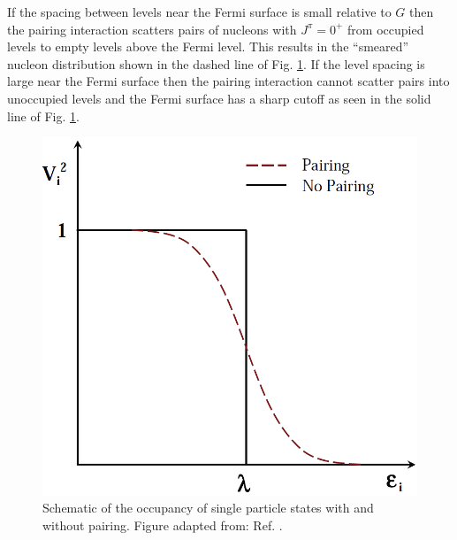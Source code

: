 If the spacing between levels near the Fermi surface is small relative to $G$ then the pairing interaction scatters pairs of nucleons with $J^{\pi}=0^+$ from occupied levels to empty levels above the Fermi level. This results in the ``smeared'' nucleon distribution shown in the dashed line of Fig. \ref{fig:chp2-pairing-fermi-surface}. If the level spacing is large near the Fermi surface then the pairing interaction cannot scatter pairs into unoccupied levels and the Fermi surface has a sharp cutoff as seen in the solid line of Fig. \ref{fig:chp2-pairing-fermi-surface}.
\begin{figure}[t!]
\centerline{\includegraphics[height=0.3\textheight]{./img/c2/pairinginteraction.png}}
	\caption{Schematic of the occupancy of single particle states with and without pairing. Figure adapted from: Ref. \cite{xfwangDissertation}.\label{fig:chp2-pairing-fermi-surface}}
\end{figure}

